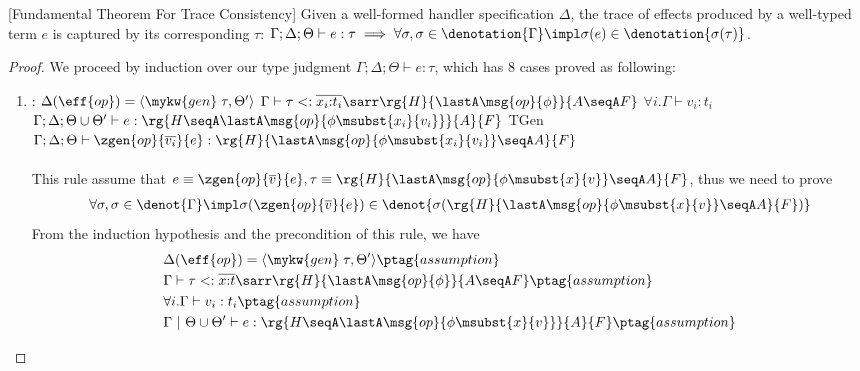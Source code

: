 \begin{theorem}\label{theorem:fundamental-ap}[Fundamental Theorem For Trace Consistency] Given
  a well-formed handler specification $\Delta$,
    the trace of effects produced by a well-typed term
    $e$ is captured by its corresponding \PAT $\tau$:
  $\Gamma; \Delta; \Theta \vdash e : \tau \implies \forall \sigma, \sigma \in
    \denotation{\Gamma} \impl \sigma(e) \in
    \denotation{\sigma(\tau)}$.
\end{theorem}
\begin{proof} We proceed by induction over our type judgment $\Gamma;\Delta;\Theta \vdash e : \tau$, which has $8$ cases proved as following:
\begin{enumerate}[label=Case]

\item:
{\footnotesize
\mprooftr{87mm}
{
$\Delta(\eff{op}) =\langle \mykw{gen}\;\tau, \Theta' \rangle$ \quad
$\Gamma \vdash \tau <: \overline{x_i{:}t_i}\sarr
\rg{H}{\lastA\msg{op}{\phi}}{A \seqA F}$ \quad
$\forall i. \Gamma \vdash v_i : t_i$ \quad
 $\Gamma; \Delta; \Theta \cup \Theta' \vdash e : \rg{H \seqA \lastA\msg{op}{\phi\msubst{x_i}{v_i}}}{A}{F}$
 }
{TGen}
{$\Gamma; \Delta; \Theta \vdash \zgen{op}{\overline{v_i}}{e} : \rg{H}{\lastA\msg{op}{\phi\msubst{x_i}{v_i}} \seqA A}{F}$}
\ \\ \ \\}
This rule assume that $e \equiv \zgen{op}{\overline{v}}{e}, \tau \equiv \rg{H}{\lastA\msg{op}{\phi\msubst{x}{v}} \seqA A}{F}$, thus we need to prove
{\footnotesize\begin{align*}
    \forall \sigma, \sigma \in \denot{\Gamma} \impl \sigma(\zgen{op}{\overline{v}}{e}) \in \denot{\sigma(\rg{H}{\lastA\msg{op}{\phi\msubst{x}{v}} \seqA A}{F})}
\end{align*}}\noindent
From the induction hypothesis and the precondition of this rule, we have
{\footnotesize\begin{alignat}{2}
\setcounter{equation}{0}
&\Delta(\eff{op}) =\langle \mykw{gen}\;\tau, \Theta' \rangle \ptag{assumption} \label{found:1-1} \\
&\Gamma \vdash \tau <: \overline{x{:}t}\sarr \rg{H}{\lastA\msg{op}{\phi}}{A \seqA F} \ptag{assumption} \label{found:1-2} \\
&\forall i. \Gamma \vdash v_i : t_i \ptag{assumption} \label{found:1-3} \\
&\Gamma ~|~ \Theta \cup \Theta' \vdash e : \rg{H \seqA \lastA\msg{op}{\phi\msubst{x}{v}}}{A}{F} \ptag{assumption} \label{found:1-5} \\

\end{alignat}}
\end{enumerate}
\end{proof}
